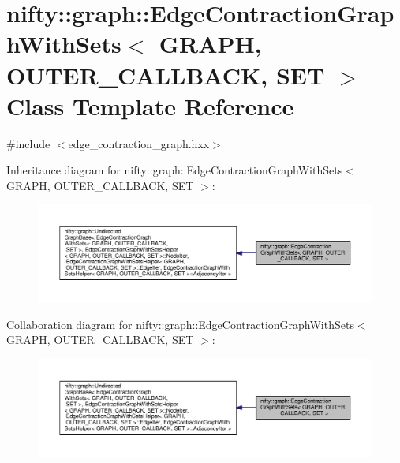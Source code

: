 \hypertarget{classnifty_1_1graph_1_1EdgeContractionGraphWithSets}{}\section{nifty\+:\+:graph\+:\+:Edge\+Contraction\+Graph\+With\+Sets$<$ G\+R\+A\+PH, O\+U\+T\+E\+R\+\_\+\+C\+A\+L\+L\+B\+A\+CK, S\+ET $>$ Class Template Reference}
\label{classnifty_1_1graph_1_1EdgeContractionGraphWithSets}


{\ttfamily \#include $<$edge\+\_\+contraction\+\_\+graph.\+hxx$>$}



Inheritance diagram for nifty\+:\+:graph\+:\+:Edge\+Contraction\+Graph\+With\+Sets$<$ G\+R\+A\+PH, O\+U\+T\+E\+R\+\_\+\+C\+A\+L\+L\+B\+A\+CK, S\+ET $>$\+:
\nopagebreak
\begin{figure}[H]
\begin{center}
\leavevmode
\includegraphics[width=350pt]{classnifty_1_1graph_1_1EdgeContractionGraphWithSets__inherit__graph}
\end{center}
\end{figure}


Collaboration diagram for nifty\+:\+:graph\+:\+:Edge\+Contraction\+Graph\+With\+Sets$<$ G\+R\+A\+PH, O\+U\+T\+E\+R\+\_\+\+C\+A\+L\+L\+B\+A\+CK, S\+ET $>$\+:
\nopagebreak
\begin{figure}[H]
\begin{center}
\leavevmode
\includegraphics[width=350pt]{classnifty_1_1graph_1_1EdgeContractionGraphWithSets__coll__graph}
\end{center}
\end{figure}
